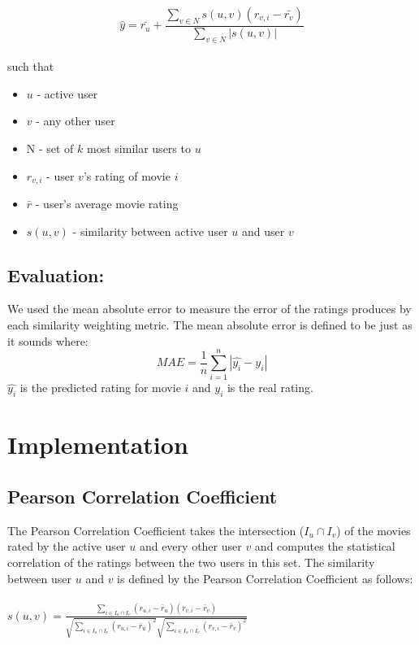 \documentclass[11pt,letterpaper]{article}
\begin{document}
$$\hat{y} = \bar{r_u} + \frac{\sum_{v\in N}s(u,v)(r_{v,i} - \bar{r_{v}})}{\sum_{v\in N}|s(u,v)|}$$
\\such that
\begin{itemize}
\item $u$ - active user
\item $v$ - any other user
\item N - set of $k$ most similar users to $u$
\item $r_{v,i}$ - user $v$'s rating of movie $i$
\item $\bar{r}$ - user's average movie rating
\item $s(u,v)$ - similarity between active user $u$ and user $v$
\end{itemize}

\subsection{Evaluation:}
We used the mean absolute error to measure the error of the ratings produces by each similarity weighting metric. The mean absolute error is defined to be just as it sounds where:
$$MAE = \frac{1}{n}\sum_{i = 1}^n|\hat{y_i} - y_i|$$
$\hat{y_i}$ is the predicted rating for movie $i$ and $y_i$ is the real rating.

\section{Implementation}
\subsection{Pearson Correlation Coefficient}
The Pearson Correlation Coefficient takes the intersection ($I_{u} \cap I_{v}$) of the movies rated by the active user $u$ and every other user $v$  and computes the statistical correlation of the ratings between the two users in this set. The similarity between user $u$ and $v$ is defined by the Pearson Correlation Coefficient as follows:\\\\
$s(u,v) = \frac{\sum_{i \in I_{u} \cap I_{v}} (r_{u, i} - \bar r_{u}) (r_{v, i} - \bar r_{v})}{\sqrt{\sum_{i \in I_{u} \cap I_{v}}(r_{u, i} - \bar r_{u})^2} \sqrt{\sum_{i \in I_{u} \cap I_{v}}(r_{v, i} - \bar r_{v})^2}} $\\
\end{document}
